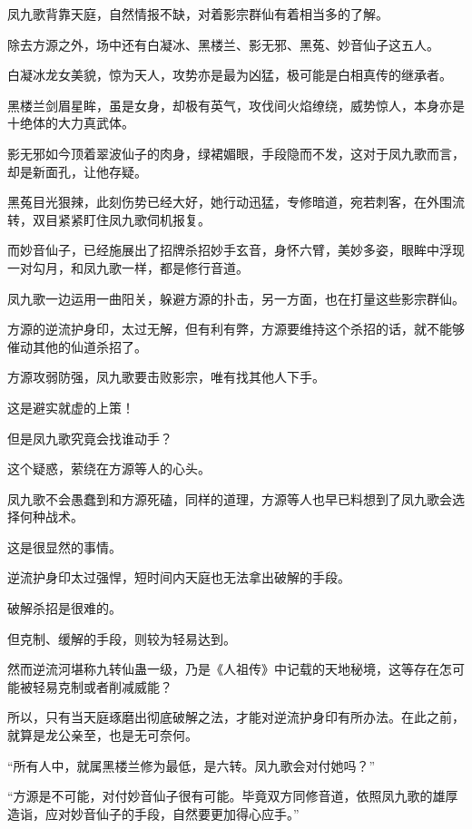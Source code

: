 
\begin{this_body}

凤九歌背靠天庭，自然情报不缺，对着影宗群仙有着相当多的了解。

除去方源之外，场中还有白凝冰、黑楼兰、影无邪、黑菟、妙音仙子这五人。

白凝冰龙女美貌，惊为天人，攻势亦是最为凶猛，极可能是白相真传的继承者。

黑楼兰剑眉星眸，虽是女身，却极有英气，攻伐间火焰缭绕，威势惊人，本身亦是十绝体的大力真武体。

影无邪如今顶着翠波仙子的肉身，绿裙媚眼，手段隐而不发，这对于凤九歌而言，却是新面孔，让他存疑。

黑菟目光狠辣，此刻伤势已经大好，她行动迅猛，专修暗道，宛若刺客，在外围流转，双目紧紧盯住凤九歌伺机报复。

而妙音仙子，已经施展出了招牌杀招妙手玄音，身怀六臂，美妙多姿，眼眸中浮现一对勾月，和凤九歌一样，都是修行音道。

凤九歌一边运用一曲阳关，躲避方源的扑击，另一方面，也在打量这些影宗群仙。

方源的逆流护身印，太过无解，但有利有弊，方源要维持这个杀招的话，就不能够催动其他的仙道杀招了。

方源攻弱防强，凤九歌要击败影宗，唯有找其他人下手。

这是避实就虚的上策！

但是凤九歌究竟会找谁动手？

这个疑惑，萦绕在方源等人的心头。

凤九歌不会愚蠢到和方源死磕，同样的道理，方源等人也早已料想到了凤九歌会选择何种战术。

这是很显然的事情。

逆流护身印太过强悍，短时间内天庭也无法拿出破解的手段。

破解杀招是很难的。

但克制、缓解的手段，则较为轻易达到。

然而逆流河堪称九转仙蛊一级，乃是《人祖传》中记载的天地秘境，这等存在怎可能被轻易克制或者削减威能？

所以，只有当天庭琢磨出彻底破解之法，才能对逆流护身印有所办法。在此之前，就算是龙公亲至，也是无可奈何。

“所有人中，就属黑楼兰修为最低，是六转。凤九歌会对付她吗？”

“方源是不可能，对付妙音仙子很有可能。毕竟双方同修音道，依照凤九歌的雄厚造诣，应对妙音仙子的手段，自然要更加得心应手。”


\end{this_body}

